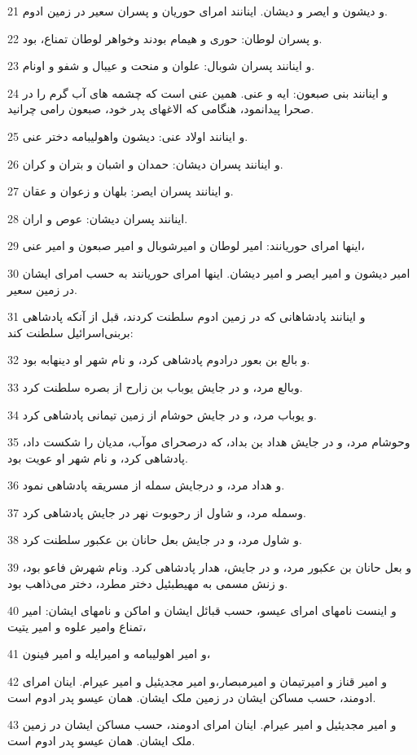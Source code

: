 \par 21 و دیشون و ایصر و دیشان. اینانند امرای حوریان و پسران سعیر در زمین ادوم.
\par 22 و پسران لوطان: حوری و هیمام بودند وخواهر لوطان تمناع، بود.
\par 23 و اینانند پسران شوبال: علوان و منحت و عیبال و شفو و اونام.
\par 24 و اینانند بنی صبعون: ایه و عنی. همین عنی است که چشمه های آب گرم را در صحرا پیدانمود، هنگامی که الاغهای پدر خود، صبعون رامی چرانید.
\par 25 و اینانند اولاد عنی: دیشون واهولیبامه دختر عنی.
\par 26 و اینانند پسران دیشان: حمدان و اشبان و بتران و کران.
\par 27 و اینانند پسران ایصر: بلهان و زعوان و عقان.
\par 28 اینانند پسران دیشان: عوص و اران.
\par 29 اینها امرای حوریانند: امیر لوطان و امیرشوبال و امیر صبعون و امیر عنی،
\par 30 امیر دیشون و امیر ایصر و امیر دیشان. اینها امرای حوریانند به حسب امرای ایشان در زمین سعیر.
\par 31 و اینانند پادشاهانی که در زمین ادوم سلطنت کردند، قبل از آنکه پادشاهی بربنی‌اسرائیل سلطنت کند:
\par 32 و بالع بن بعور درادوم پادشاهی کرد، و نام شهر او دینهابه بود.
\par 33 وبالع مرد، و در جایش یوباب بن زارح از بصره سلطنت کرد.
\par 34 و یوباب مرد، و در جایش حوشام از زمین تیمانی پادشاهی کرد.
\par 35 وحوشام مرد، و در جایش هداد بن بداد، که درصحرای موآب، مدیان را شکست داد، پادشاهی کرد، و نام شهر او عویت بود.
\par 36 و هداد مرد، و درجایش سمله از مسریقه پادشاهی نمود.
\par 37 وسمله مرد، و شاول از رحوبوت نهر در جایش پادشاهی کرد.
\par 38 و شاول مرد، و در جایش بعل حانان بن عکبور سلطنت کرد.
\par 39 و بعل حانان بن عکبور مرد، و در جایش، هدار پادشاهی کرد. ونام شهرش فاعو بود، و زنش مسمی به مهیطبئیل دختر مطرد، دختر می‌ذاهب بود.
\par 40 و اینست نامهای امرای عیسو، حسب قبائل ایشان و اماکن و نامهای ایشان: امیر تمناع وامیر علوه و امیر یتیت،
\par 41 و امیر اهولیبامه و امیرایله و امیر فینون،
\par 42 و امیر قناز و امیرتیمان و امیرمبصار،و امیر مجدیئیل و امیر عیرام. اینان امرای ادومند، حسب مساکن ایشان در زمین ملک ایشان. همان عیسو پدر ادوم است.
\par 43 و امیر مجدیئیل و امیر عیرام. اینان امرای ادومند، حسب مساکن ایشان در زمین ملک ایشان. همان عیسو پدر ادوم است.
 
